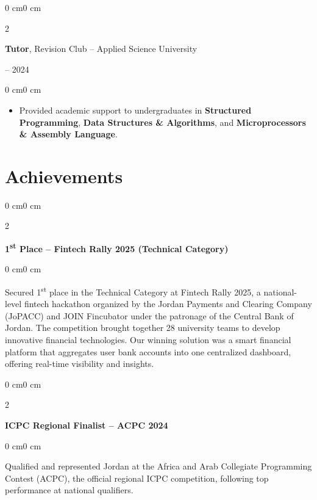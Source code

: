 \documentclass[10pt, letterpaper]{article}
\newenvironment{highlights}{
    \begin{itemize}[
        topsep=0.10 cm,
        parsep=0.10 cm,
        partopsep=0pt,
        itemsep=0pt,
        leftmargin=0 cm + 10pt
    ]
}{
    \end{itemize}
}
\newenvironment{onecolentry}{
    \begin{adjustwidth}{0 cm}{0 cm}
}{
    \end{adjustwidth}
}
\newenvironment{twocolentry}[2][]{
    \onecolentry
    \def\secondColumn{#2}
    \setcolumnwidth{\fill, 4.5 cm}
    \begin{paracol}{2}
}{
    \switchcolumn \raggedleft \secondColumn
    \end{paracol}
    \endonecolentry
}
\begin{document}
        \vspace{0.2 cm}

        \begin{twocolentry}{
            2023 -- 2024
        }
            \textbf{Tutor}, Revision Club -- Applied Science University
        \end{twocolentry}
        
        \vspace{0.10 cm}
        \begin{onecolentry}
            \begin{highlights}
                \item Provided academic support to undergraduates in \textbf{Structured Programming}, \textbf{Data Structures \& Algorithms}, and \textbf{Microprocessors \& Assembly Language}.
            \end{highlights}
        \end{onecolentry}

    \section{Achievements}
        \vspace{0.2 cm}
        \begin{twocolentry}{}
            \textbf{1\textsuperscript{st} Place -- Fintech Rally 2025 (Technical Category)}
        \end{twocolentry}
        \begin{onecolentry}
            Secured 1\textsuperscript{st} place in the Technical Category at Fintech Rally 2025, a national-level fintech hackathon organized by the Jordan Payments and Clearing Company (JoPACC) and JOIN Fincubator under the patronage of the Central Bank of Jordan. The competition brought together 28 university teams to develop innovative financial technologies. Our winning solution was a smart financial platform that aggregates user bank accounts into one centralized dashboard, offering real-time visibility and insights.
        \end{onecolentry}

        \vspace{0.2 cm}
        \begin{twocolentry}{}
            \textbf{ICPC Regional Finalist -- ACPC 2024}
        \end{twocolentry}
        \begin{onecolentry}
            Qualified and represented Jordan at the Africa and Arab Collegiate Programming Contest (ACPC), the official regional ICPC competition, following top performance at national qualifiers.
        \end{onecolentry}
        
\end{document}
